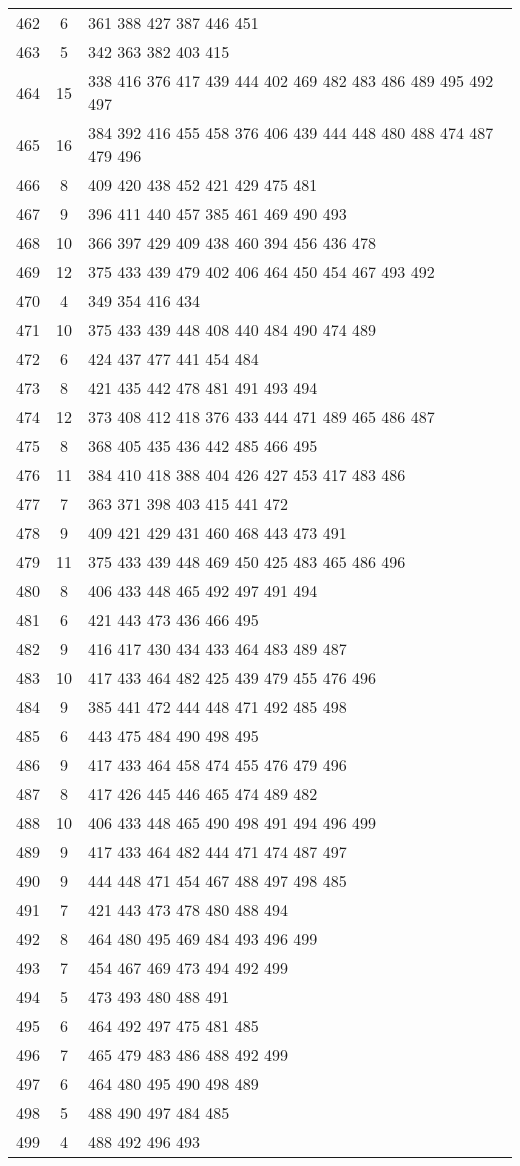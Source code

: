 \documentclass{standalone}
\begin{document}
\begin{tabular}{c c l}
462 & 6 & 361 388 427 387 446 451 \\
463 & 5 & 342 363 382 403 415 \\
464 & 15 & 338 416 376 417 439 444 402 469 482 483 486 489 495 492 497 \\
465 & 16 & 384 392 416 455 458 376 406 439 444 448 480 488 474 487 479 496 \\
466 & 8 & 409 420 438 452 421 429 475 481 \\
467 & 9 & 396 411 440 457 385 461 469 490 493 \\
468 & 10 & 366 397 429 409 438 460 394 456 436 478 \\
469 & 12 & 375 433 439 479 402 406 464 450 454 467 493 492 \\
470 & 4 & 349 354 416 434 \\
471 & 10 & 375 433 439 448 408 440 484 490 474 489 \\
472 & 6 & 424 437 477 441 454 484 \\
473 & 8 & 421 435 442 478 481 491 493 494 \\
474 & 12 & 373 408 412 418 376 433 444 471 489 465 486 487 \\
475 & 8 & 368 405 435 436 442 485 466 495 \\
476 & 11 & 384 410 418 388 404 426 427 453 417 483 486 \\
477 & 7 & 363 371 398 403 415 441 472 \\
478 & 9 & 409 421 429 431 460 468 443 473 491 \\
479 & 11 & 375 433 439 448 469 450 425 483 465 486 496 \\
480 & 8 & 406 433 448 465 492 497 491 494 \\
481 & 6 & 421 443 473 436 466 495 \\
482 & 9 & 416 417 430 434 433 464 483 489 487 \\
483 & 10 & 417 433 464 482 425 439 479 455 476 496 \\
484 & 9 & 385 441 472 444 448 471 492 485 498 \\
485 & 6 & 443 475 484 490 498 495 \\
486 & 9 & 417 433 464 458 474 455 476 479 496 \\
487 & 8 & 417 426 445 446 465 474 489 482 \\
488 & 10 & 406 433 448 465 490 498 491 494 496 499 \\
489 & 9 & 417 433 464 482 444 471 474 487 497 \\
490 & 9 & 444 448 471 454 467 488 497 498 485 \\
491 & 7 & 421 443 473 478 480 488 494 \\
492 & 8 & 464 480 495 469 484 493 496 499 \\
493 & 7 & 454 467 469 473 494 492 499 \\
494 & 5 & 473 493 480 488 491 \\
495 & 6 & 464 492 497 475 481 485 \\
496 & 7 & 465 479 483 486 488 492 499 \\
497 & 6 & 464 480 495 490 498 489 \\
498 & 5 & 488 490 497 484 485 \\
499 & 4 & 488 492 496 493 \\
\end{tabular}
\end{document}
